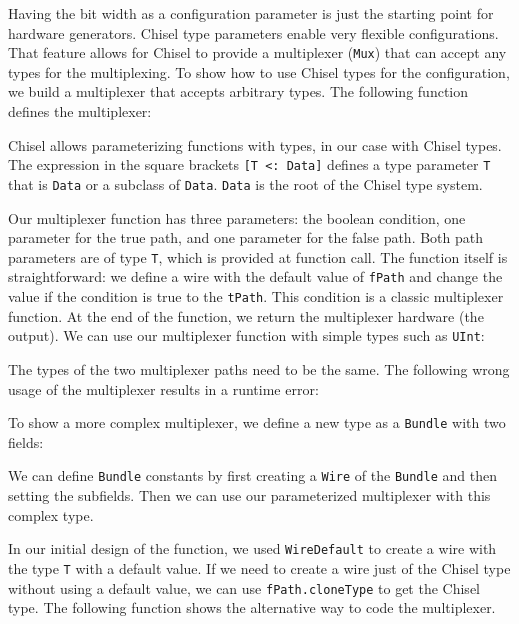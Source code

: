 \documentclass[%
    10pt,
    headinclude, footexclude,
    openright, %
    notitlepage,
    cleardoubleempty,
    headsepline,
    pointlessnumbers,
    bibtotoc, idxtotoc,
    ]{scrbook}
\newcommand{\code}[1]{{\small{\texttt{#1}}}}
\begin{document}
Having the bit width as a configuration parameter is just the starting point for
hardware generators. Chisel type parameters enable very flexible configurations.
That feature allows for Chisel to provide a multiplexer (\code{Mux}) that
can accept any types for the multiplexing.
To show how to use Chisel types for the configuration, we build a multiplexer
that accepts arbitrary types. The following function defines the multiplexer:


Chisel allows parameterizing functions with types, in our case with Chisel
types. The expression in the square brackets \code{[T <: Data]} defines
a type parameter \code{T} that is \code{Data} or a subclass of \code{Data}.
\code{Data} is the root of the Chisel type system.

Our multiplexer function has three parameters: the boolean condition,
one parameter for the true path, and one parameter for the false path.
Both path parameters are of type \code{T}, which is
provided at function call. The function itself is straightforward:
we define a wire with the default value of \code{fPath} and
change the value if the condition is true to the \code{tPath}.
This condition is a classic multiplexer function.
At the end of the function, we return the multiplexer hardware (the output).
We can use our multiplexer function with simple types such as
\code{UInt}:


\noindent The types of the two multiplexer paths need to be the same.
The following wrong usage of the multiplexer results in a runtime error:


\noindent To show a more complex multiplexer, we define a new type as a \code{Bundle} with two fields:


\noindent We can define \code{Bundle} constants by first creating
a \code{Wire} of the \code{Bundle} and then setting the subfields.
Then we can use our parameterized multiplexer with this complex type.


In our initial design of the function, we used \code{WireDefault}
to create a wire with the type \code{T} with a default value.
If we need to create a wire just of the Chisel type without using a default
value, we can use \code{fPath.cloneType} to get the Chisel type.
The following function shows the alternative way to code the multiplexer.
\end{document}
